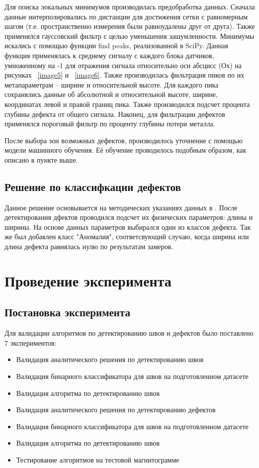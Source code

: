 \documentclass[a4paper,article,14pt]{extarticle}
\begin{document}
Для поиска локальных минимумов производилась предобработка данных. Сначала данные интерполировались по 
дистанции для достижения сетки с равномерным шагом (т.е. пространственно измерения были равноудалены друг от друга). 
Также применялся гауссовский фильтр с целью уменьшения зашумленности. Минимумы искались с помощью функции find peaks, 
реализованной в SciPy. Данная функция применялась к среднему сигналу с каждого блока датчиков, умноженному на -1 
для отражения сигнала относительно оси абсцисс (Ох) на рисунках  ~\ref{image5} и ~\ref{image6}. Также производилась фильтрация пиков по их 
метапараметрам – ширине и относительной высоте. Для каждого пика сохранялись данные об абсолютной и относительной 
высоте, ширине, координатах левой и правой границ пика. Также производился подсчет процента глубины дефекта от общего 
сигнала. Наконец, для фильтрации дефектов применялся пороговый фильтр по проценту глубины потери металла.

После выбора зон возможных дефектов, производилось уточнение с помощью модели машинного обучения. Её обучение 
проводилось подобным образом, как описано в пункте выше.

\subsection{Решение по классифкации дефектов}

Данное решение основывается на методических указаниях данных в \cite{g1}. 
После детектирования дфектов проводился подсчет их физических параметров: длины и ширины. 
На основе данных параметров выбирался один из классов дефекта. 
Так же был добавлен класс "Аномалия", соответсвующий случаю, когда ширина или длина 
дефекта равнялась нулю по результатам замеров.


\pagebreak
\section{Проведение эксперимента}

\subsection{Постановка эксперимента}

Для валидации алгоритмов по детектированию швов и дефектов было поставлено 7 экспериментов:
\begin{itemize}
    \item Валидация аналитического решения по детектированию швов
    \item Валидация бинарного классификатора для швов на подготовленном датасете
    \item Валидация алгоритма по детектированию швов
    \item Валидация аналитического решения по детектированию дефектов
    \item Валидация бинарного классификатора для швов на подготовленном датасете
    \item Валидация алгоритма по детектированию швов
    \item Тестирование алгоритмов на тестовой магнитограмме
\end{itemize}
\end{document}
